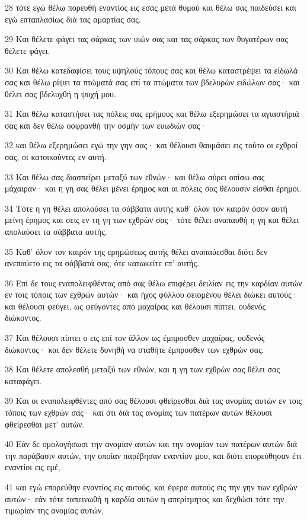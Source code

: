 \par 28 τότε εγώ θέλω πορευθή εναντίος εις εσάς μετά θυμού και θέλω σας παιδεύσει και εγώ επταπλασίως διά τας αμαρτίας σας.
\par 29 Και θέλετε φάγει τας σάρκας των υιών σας και τας σάρκας των θυγατέρων σας θέλετε φάγει.
\par 30 Και θέλω κατεδαφίσει τους υψηλούς τόπους σας και θέλω καταστρέψει τα είδωλά σας και θέλω ρίψει τα πτώματά σας επί τα πτώματα των βδελυρών ειδώλων σας· και θέλει σας βδελυχθή η ψυχή μου.
\par 31 Και θέλω καταστήσει τας πόλεις σας ερήμους και θέλω εξερημώσει τα αγιαστήριά σας και δεν θέλω οσφρανθή την οσμήν των ευωδιών σας·
\par 32 και θέλω εξερημώσει εγώ την γην σας· και θέλουσι θαυμάσει εις τούτο οι εχθροί σας, οι κατοικούντες εν αυτή.
\par 33 Και θέλω σας διασπείρει μεταξύ των εθνών· και θέλω σύρει οπίσω σας μάχαιραν· και η γη σας θέλει μένει έρημος και αι πόλεις σας θέλουσιν είσθαι έρημοι.
\par 34 Τότε η γη θέλει απολαύσει τα σάββατα αυτής καθ' όλον τον καιρόν όσον αυτή μείνη έρημος και σεις εν τη γη των εχθρών σας· τότε θέλει αναπαυθή η γη και θέλει απολαύσει τα σάββατα αυτής.
\par 35 Καθ' όλον τον καιρόν της ερημώσεως αυτής θέλει αναπαύεσθαι διότι δεν ανεπαύετο εις τα σάββατά σας, ότε κατωκείτε επ' αυτής.
\par 36 Επί δε τους εναπολειφθέντας από σας θέλω επιφέρει δειλίαν εις την καρδίαν αυτών εν τοις τόποις των εχθρών αυτών· και ήχος φύλλου σειομένου θέλει διώκει αυτούς· και θέλουσι φεύγει, ως φεύγοντες από μαχαίρας και θέλουσι πίπτει, ουδενός διώκοντος.
\par 37 Και θέλουσι πίπτει ο εις επί τον άλλον ως έμπροσθεν μαχαίρας, ουδενός διώκοντος· και δεν θέλετε δυνηθή να σταθήτε έμπροσθεν των εχθρών σας.
\par 38 Και θέλετε απολεσθή μεταξύ των εθνών, και η γη των εχθρών σας θέλει σας καταφάγει.
\par 39 Και οι εναπολειφθέντες από σας θέλουσι φθείρεσθαι διά τας ανομίας αυτών εν τοις τόποις των εχθρών σας· και ότι διά τας ανομίας των πατέρων αυτών θέλουσι φθείρεσθαι μετ' αυτών.
\par 40 Εάν δε ομολογήσωσι την ανομίαν αυτών και την ανομίαν των πατέρων αυτών διά την παράβασιν αυτών, την οποίαν παρέβησαν εναντίον μου, και διότι επορεύθησαν έτι εναντίοι εις εμέ,
\par 41 και εγώ επορεύθην εναντίος εις αυτούς, και έφερα αυτούς εις την γην των εχθρών αυτών· εάν τότε ταπεινωθή η καρδία αυτών η απερίτμητος και δεχθώσι τότε την τιμωρίαν της ανομίας αυτών,
